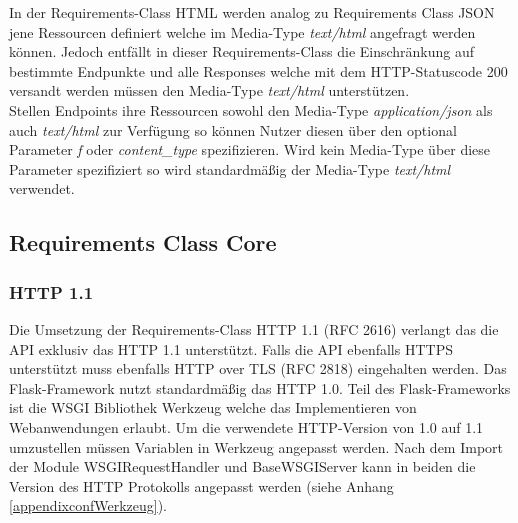 In der Requirements-Class HTML werden analog zu Requirements Class JSON jene Ressourcen definiert welche im Media-Type \textit{text/html} angefragt werden können. Jedoch
entfällt in dieser Requirements-Class die Einschränkung auf bestimmte Endpunkte und alle Responses welche mit dem HTTP-Statuscode 200 versandt werden müssen den 
Media-Type \textit{text/html} unterstützen.\\
Stellen Endpoints ihre Ressourcen sowohl den Media-Type \textit{application/json} als auch \textit{text/html} zur Verfügung so können Nutzer diesen über den optional Parameter
\textit{f} oder \textit{content\_type} spezifizieren. Wird kein Media-Type über diese Parameter spezifiziert so wird standardmäßig der Media-Type \textit{text/html} verwendet. \\

\subsection{Requirements Class Core}
\subsubsection{HTTP 1.1}
Die Umsetzung der Requirements-Class HTTP 1.1 (RFC 2616) verlangt das die API exklusiv das HTTP 1.1 unterstützt. 
Falls die API ebenfalls HTTPS unterstützt muss ebenfalls HTTP over TLS (RFC 2818) eingehalten werden. 
Das Flask-Framework nutzt standardmäßig das HTTP 1.0. Teil des Flask-Frameworks ist die WSGI Bibliothek Werkzeug welche
das Implementieren von Webanwendungen erlaubt. Um die verwendete HTTP-Version von 1.0 auf 1.1 umzustellen müssen Variablen 
in Werkzeug angepasst werden. Nach dem Import der Module WSGIRequestHandler und BaseWSGIServer kann in beiden die 
Version des HTTP Protokolls angepasst werden (siehe Anhang \ref{appendixconfWerkzeug}). 

